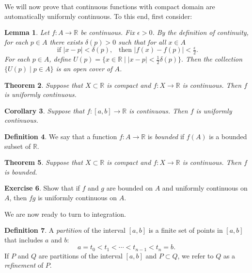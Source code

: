 \documentclass[12pt]{article}
\newcommand{\bbR}{\mathbb{R}}
\providecommand{\abs}[1]{\lvert #1 \rvert}
\providecommand{\arr}{\longrightarrow}
\renewcommand{\_}[1]{\underline{ #1 }}
\newtheorem{theorem}{Theorem}[section]
\newtheorem{lemma}[theorem]{Lemma}
\newtheorem{corollary}[theorem]{Corollary}
\theoremstyle{definition}
\newtheorem{definition}[theorem]{Definition}
\newtheorem{exercise}[theorem]{Exercise}
\numberwithin{equation}{subsection}
\begin{document}
We will now prove that continuous functions with compact domain are automatically uniformly continuous.  To this end, first consider:

\begin{lemma}  
Let $f \colon A \arr \bbR$ be continuous.  Fix $\epsilon > 0$.  By the definition of continuity, for each $p \in A$ there exists $\delta(p) > 0$ such that for all $x \in A$
\[
\text{ if $\abs{x - p} < \delta(p)$,} \quad \text{then $\abs{f(x) - f(p)} < \tfrac{\epsilon}{2}$.}
\]
For each $p\in A$, define
$U(p) = \{ x \in \bbR \mid \abs{x - p} < \tfrac{1}{2} \delta(p) \}.$
Then the collection $\{ U(p) \mid p \in A \}$ is an open cover of $A$.
\end{lemma}



\begin{theorem}
Suppose that $X \subset \bbR$ is compact and $f \colon X \arr \bbR$ is continuous.  Then $f$ is uniformly continuous.
\end{theorem}

\begin{corollary}
Suppose that $f \colon [a, b] \arr \bbR$ is continuous.  Then $f$ is uniformly continuous.
\end{corollary}

\begin{definition}
We say that a function $f:A\to\bbR$ is \emph{bounded} if $f(A)$ is a bounded subset of $\bbR$.
\end{definition}
\begin{theorem}
Suppose that $X \subset \bbR$ is compact and $f \colon X \arr \bbR$ is continuous.  Then $f$ is bounded.
\end{theorem}

\begin{exercise}
Show that if $f$ and $g$ are bounded on $A$ and uniformly continuous on $A$, 
then $fg$ is uniformly continuous on $A$.
\end{exercise}

\medskip

We are now ready to turn to integration.  

\begin{definition} A \emph{partition} of the interval $[a, b]$ is a finite set of points in $[a, b]$ that includes $a$ and $b$:
\[
a = t_0 < t_1 < \dotsm < t_{n - 1} < t_n = b.
\]
If $P$ and $Q$ are partitions of the interval $[a,b]$ and $P\subset Q$, we refer to $Q$ 
as a \emph{refinement} of $P$.
\end{definition}
\end{document}
